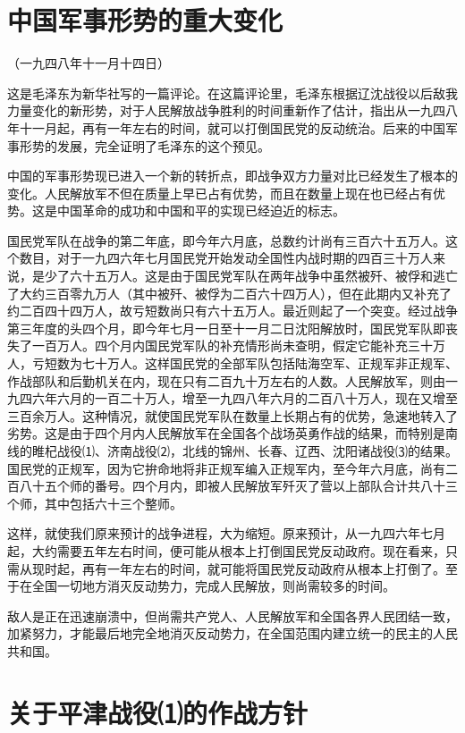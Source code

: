 \documentclass[UTF-8, a5paper, 12pt]{ctexart}
\begin{document}
\section{中国军事形势的重大变化}

（一九四八年十一月十四日）

这是毛泽东为新华社写的一篇评论。在这篇评论里，毛泽东根据辽沈战役以后敌我力量变化的新形势，对于人民解放战争胜利的时间重新作了估计，指出从一九四八年十一月起，再有一年左右的时间，就可以打倒国民党的反动统治。后来的中国军事形势的发展，完全证明了毛泽东的这个预见。

中国的军事形势现已进入一个新的转折点，即战争双方力量对比已经发生了根本的变化。人民解放军不但在质量上早已占有优势，而且在数量上现在也已经占有优势。这是中国革命的成功和中国和平的实现已经迫近的标志。

国民党军队在战争的第二年底，即今年六月底，总数约计尚有三百六十五万人。这个数目，对于一九四六年七月国民党开始发动全国性内战时期的四百三十万人来说，是少了六十五万人。这是由于国民党军队在两年战争中虽然被歼、被俘和逃亡了大约三百零九万人（其中被歼、被俘为二百六十四万人），但在此期内又补充了约二百四十四万人，故亏短数尚只有六十五万人。最近则起了一个突变。经过战争第三年度的头四个月，即今年七月一日至十一月二日沈阳解放时，国民党军队即丧失了一百万人。四个月内国民党军队的补充情形尚未查明，假定它能补充三十万人，亏短数为七十万人。这样国民党的全部军队包括陆海空军、正规军非正规军、作战部队和后勤机关在内，现在只有二百九十万左右的人数。人民解放军，则由一九四六年六月的一百二十万人，增至一九四八年六月的二百八十万人，现在又增至三百余万人。这种情况，就使国民党军队在数量上长期占有的优势，急速地转入了劣势。这是由于四个月内人民解放军在全国各个战场英勇作战的结果，而特别是南线的睢杞战役⑴、济南战役⑵，北线的锦州、长春、辽西、沈阳诸战役⑶的结果。国民党的正规军，因为它拚命地将非正规军编入正规军内，至今年六月底，尚有二百八十五个师的番号。四个月内，即被人民解放军歼灭了营以上部队合计共八十三个师，其中包括六十三个整师。

这样，就使我们原来预计的战争进程，大为缩短。原来预计，从一九四六年七月起，大约需要五年左右时间，便可能从根本上打倒国民党反动政府。现在看来，只需从现时起，再有一年左右的时间，就可能将国民党反动政府从根本上打倒了。至于在全国一切地方消灭反动势力，完成人民解放，则尚需较多的时间。

敌人是正在迅速崩溃中，但尚需共产党人、人民解放军和全国各界人民团结一致，加紧努力，才能最后地完全地消灭反动势力，在全国范围内建立统一的民主的人民共和国。

\section{关于平津战役⑴的作战方针}
\end{document}
